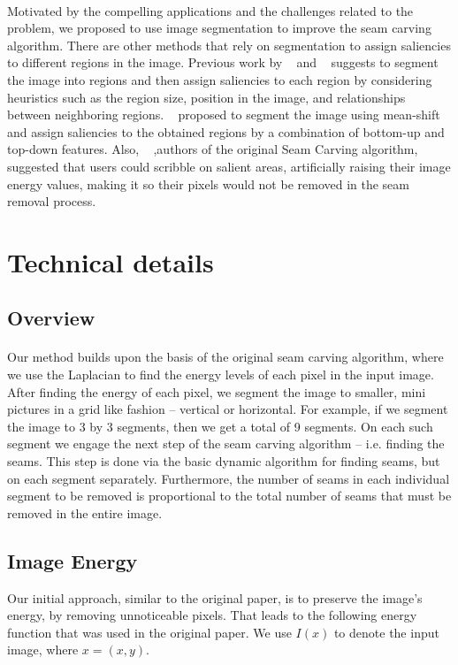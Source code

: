 \documentclass[conference]{acmsiggraph}
\begin{document}
\paragraph{}
Motivated by the compelling applications and the challenges related to the problem, we proposed to use image segmentation to improve the seam carving algorithm. There are other methods that rely on segmentation to assign saliencies to different regions in the image. Previous work by ~\cite{Liu2007} and ~\cite{Hasan2009} suggests to segment the image into regions and then assign saliencies to each region by considering heuristics such as the region size, position in the image, and relationships between neighboring regions. ~\cite{Setlur2005} proposed to segment the image using mean-shift and assign saliencies to the obtained regions by a combination of bottom-up and top-down features. Also, ~\cite{Avidan2007} ,authors of the original Seam Carving algorithm, suggested that users could scribble on salient areas, artificially raising their image energy values, making it so their pixels would not be removed in the seam removal process.  

\section{Technical details}

\subsection{Overview}

\paragraph{}
Our method builds upon the basis of the original seam carving algorithm, where we use the Laplacian to find the energy levels of each pixel in the input image. After finding the energy of each pixel, we segment the image to smaller, mini pictures in a grid like fashion -- vertical or horizontal. For example, if we segment the image to 3 by 3 segments, then we get a total of 9 segments. On each such segment we engage the next step of the seam carving algorithm -- i.e. finding the seams. This step is done via the basic dynamic algorithm for finding seams, but on each segment separately.  Furthermore, the  number of seams in each individual segment to be removed is proportional to the total number of seams that must be removed in the entire image.  

\subsection{Image Energy}
Our initial approach, similar to the original paper, is to preserve the image's energy, by removing unnoticeable pixels. That leads to the following energy function that was used in the original paper. We use $I(x)$ to denote the input image, where $x = (x, y)$. 
\end{document}
